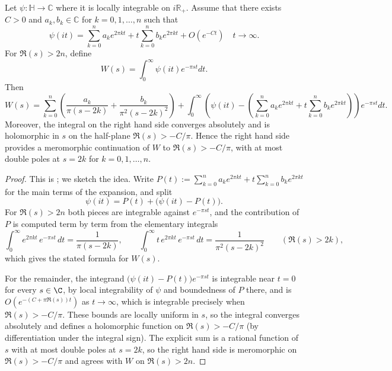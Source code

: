 \begin{proposition}\label{prop:laplace-continuation}
\leanok
    Let $\psi:\mathbb{H}\to\mathbb{C}$ where it is locally integrable on $i\mathbb{R}_+$.
    Assume that there exists $C>0$ and $a_k, b_k \in \mathbb{C}$ for $k = 0, 1, \dots, n$ such that
    \[
    \psi(it) = \sum_{k=0}^{n} a_k e^{2\pi k t} + t\sum_{k=0}^{n} b_k e^{2\pi k t} + O(e^{-Ct})\quad t\to\infty.
    \]
    For $\Re(s) > 2n$, define
    \[
    W(s) = \int_0^\infty \psi(it) e^{-\pi s t} dt.
    \]
    Then
    \[
    W(s) = \sum_{k=0}^{n}\left(\frac{a_k}{\pi(s-2k)} + \frac{b_k}{\pi^2(s-2k)^2}\right) + \int_0^\infty \left(\psi(it) - \left(\sum_{k=0}^{n} a_k e^{2\pi k t} + t\sum_{k=0}^{n} b_k e^{2\pi k t}\right)\right) e^{-\pi s t} dt.
    \]
    Moreover, the integral on the right hand side converges absolutely and is holomorphic in $s$ on the half-plane $\Re(s) > -C/\pi$.
    Hence the right hand side provides a meromorphic continuation of $W$ to $\Re(s) > -C/\pi$, with at most double poles at $s = 2k$ for $k = 0, 1, \dots, n$.
\end{proposition}
\begin{proof}
    This is \cite[Proposition~2.1]{FGH}; we sketch the idea.
    Write $P(t) := \sum_{k=0}^{n} a_k e^{2\pi k t} + t\sum_{k=0}^{n} b_k e^{2\pi k t}$ for the main terms of the expansion, and split
    \[
    \psi(it) = P(t) + \bigl(\psi(it) - P(t)\bigr).
    \]
    For $\Re(s) > 2n$ both pieces are integrable against $e^{-\pi s t}$, and the contribution of $P$ is computed term by term from the elementary integrals
    \[
    \int_0^\infty e^{2\pi k t}\, e^{-\pi s t}\, dt = \frac{1}{\pi(s - 2k)}, \qquad
    \int_0^\infty t\, e^{2\pi k t}\, e^{-\pi s t}\, dt = \frac{1}{\pi^2(s - 2k)^2} \qquad (\Re(s) > 2k),
    \]
    which gives the stated formula for $W(s)$.

    For the remainder, the integrand $\bigl(\psi(it) - P(t)\bigr) e^{-\pi s t}$ is integrable near $t = 0$ for every $s \in \C$, by local integrability of $\psi$ and boundedness of $P$ there, and is $O(e^{-(C + \pi \Re(s)) t})$ as $t \to \infty$, which is integrable precisely when $\Re(s) > -C/\pi$.
    These bounds are locally uniform in $s$, so the integral converges absolutely and defines a holomorphic function on $\Re(s) > -C/\pi$ (by differentiation under the integral sign).
    The explicit sum is a rational function of $s$ with at most double poles at $s = 2k$, so the right hand side is meromorphic on $\Re(s) > -C/\pi$ and agrees with $W$ on $\Re(s) > 2n$.
\end{proof}

